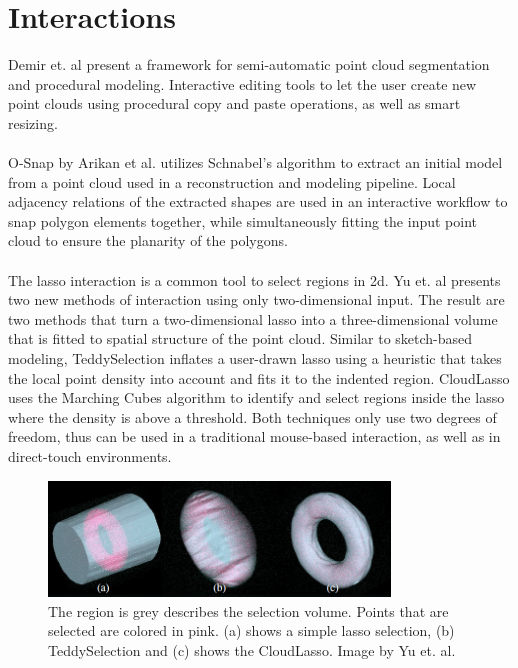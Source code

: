 \section {Interactions}


Demir et. al\cite{demir2015procedural} present a framework for semi-automatic point cloud segmentation and procedural modeling. Interactive editing tools to let the user create new point clouds using procedural copy and paste operations, as well as smart resizing. 
\\
\\
O-Snap by Arikan et al. \cite{arikan-2013-osn} utilizes Schnabel's algorithm to extract an initial model from a point cloud used in a reconstruction and modeling pipeline. Local adjacency relations of the extracted shapes are used in an interactive workflow to snap polygon elements together, while simultaneously fitting the input point cloud to ensure the planarity of the polygons. 
\\
\\
The lasso interaction is a common tool to select regions in 2d. Yu et. al\cite{yu2012efficient} presents two new methods of interaction using only two-dimensional input. The result are two methods that turn a two-dimensional lasso into a three-dimensional volume that is fitted to spatial structure of the point cloud. Similar to sketch-based modeling\cite{igarashi2007teddy}, TeddySelection inflates a user-drawn lasso using a heuristic that takes the local point density into account and fits it to the indented region. CloudLasso uses the Marching Cubes algorithm\cite{lorensen1987marching} to identify and select regions inside the lasso where the density is above a threshold. Both techniques only use two degrees of freedom, thus can be used in a traditional mouse-based interaction, as well as in direct-touch environments. 

\begin{figure}
    \centering
    \includegraphics[width=0.81\textwidth]{Related_Work/teddyCloudSelection.png}%
    \caption{The region is grey describes the selection volume. Points that are selected are colored in pink. (a) shows a simple lasso selection, (b) TeddySelection and (c) shows the CloudLasso. Image by Yu et. al\cite{yu2012efficient}.}
    \label{fig:teddyCloudSelection}
\end{figure}

